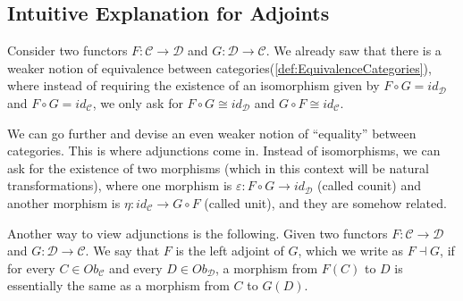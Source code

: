 \subsection{Intuitive Explanation for Adjoints}

Consider two functors $F:\mathcal C \to \mathcal D$ and $G:\mathcal D \to \mathcal C$.
We already saw that there is a weaker notion
of equivalence between categories(\ref{def:EquivalenceCategories}), where instead of
requiring the existence of an isomorphism given by
$F \circ G = id_\mathcal D$ and $F \circ G = id_\mathcal C$, we only
ask for $F \circ G \cong id_\mathcal D$ and $G \circ F \cong id_\mathcal C$.

We can go further and devise an even weaker notion of ``equality''
between categories.
This is where adjunctions come in. Instead
of isomorphisms, we can ask for the existence of two morphisms
(which in this context will be natural transformations),
where one morphism is $\varepsilon:F\circ G \to id_\mathcal D$ (called counit) and another morphism
is $\eta:id_\mathcal C \to G\circ F $ (called unit), and they are somehow related.

Another way to view adjunctions is the following. Given two functors $F:\mathcal C \to \mathcal D$
and $G:\mathcal D \to \mathcal C$. We say that $F$ is the left adjoint of $G$, which we write as $F \dashv G$,
if for every $C \in Ob_\mathcal C$ and every $D \in Ob_\mathcal D$, a morphism from $F(C)$ to $D$
is essentially the same as a morphism from $C$ to $G(D)$.



